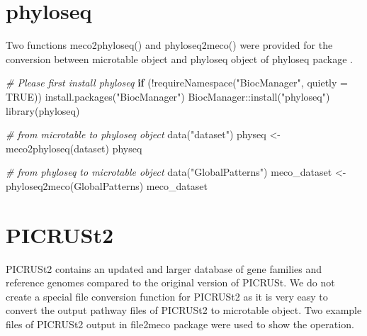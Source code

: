 \documentclass[
]{book}
\newenvironment{Shaded}{\begin{snugshade}}{\end{snugshade}}
\newcommand{\AttributeTok}[1]{\textcolor[rgb]{0.77,0.63,0.00}{#1}}
\newcommand{\CommentTok}[1]{\textcolor[rgb]{0.56,0.35,0.01}{\textit{#1}}}
\newcommand{\ConstantTok}[1]{\textcolor[rgb]{0.00,0.00,0.00}{#1}}
\newcommand{\ControlFlowTok}[1]{\textcolor[rgb]{0.13,0.29,0.53}{\textbf{#1}}}
\newcommand{\FunctionTok}[1]{\textcolor[rgb]{0.00,0.00,0.00}{#1}}
\newcommand{\NormalTok}[1]{#1}
\newcommand{\OtherTok}[1]{\textcolor[rgb]{0.56,0.35,0.01}{#1}}
\newcommand{\SpecialCharTok}[1]{\textcolor[rgb]{0.00,0.00,0.00}{#1}}
\newcommand{\StringTok}[1]{\textcolor[rgb]{0.31,0.60,0.02}{#1}}
\begin{document}
\hypertarget{phyloseq}{%
\section{phyloseq}\label{phyloseq}}

Two functions meco2phyloseq() and phyloseq2meco() were provided for the conversion between microtable object and phyloseq object of phyloseq package \citep{Mcmurdie_phyloseq_2013}.

\begin{Shaded}
\begin{Highlighting}[]
\CommentTok{\# Please first install phyloseq}
\ControlFlowTok{if}\NormalTok{ (}\SpecialCharTok{!}\FunctionTok{requireNamespace}\NormalTok{(}\StringTok{"BiocManager"}\NormalTok{, }\AttributeTok{quietly =} \ConstantTok{TRUE}\NormalTok{)) }\FunctionTok{install.packages}\NormalTok{(}\StringTok{"BiocManager"}\NormalTok{)}
\NormalTok{BiocManager}\SpecialCharTok{::}\FunctionTok{install}\NormalTok{(}\StringTok{"phyloseq"}\NormalTok{)}
\FunctionTok{library}\NormalTok{(phyloseq)}
\end{Highlighting}
\end{Shaded}

\begin{Shaded}
\begin{Highlighting}[]
\CommentTok{\# from microtable to phyloseq object}
\FunctionTok{data}\NormalTok{(}\StringTok{"dataset"}\NormalTok{)}
\NormalTok{physeq }\OtherTok{\textless{}{-}} \FunctionTok{meco2phyloseq}\NormalTok{(dataset)}
\NormalTok{physeq}
\end{Highlighting}
\end{Shaded}

\begin{Shaded}
\begin{Highlighting}[]
\CommentTok{\# from phyloseq to microtable object}
\FunctionTok{data}\NormalTok{(}\StringTok{"GlobalPatterns"}\NormalTok{)}
\NormalTok{meco\_dataset }\OtherTok{\textless{}{-}} \FunctionTok{phyloseq2meco}\NormalTok{(GlobalPatterns)}
\NormalTok{meco\_dataset}
\end{Highlighting}
\end{Shaded}

\hypertarget{picrust2}{%
\section{PICRUSt2}\label{picrust2}}

PICRUSt2 \citep{Douglas_PICRUSt2_2020} contains an updated and larger database of gene families and reference genomes compared to the original version of PICRUSt.
We do not create a special file conversion function for PICRUSt2
as it is very easy to convert the output pathway files of PICRUSt2 to microtable object.
Two example files of PICRUSt2 output in file2meco package were used to show the operation.
\end{document}
